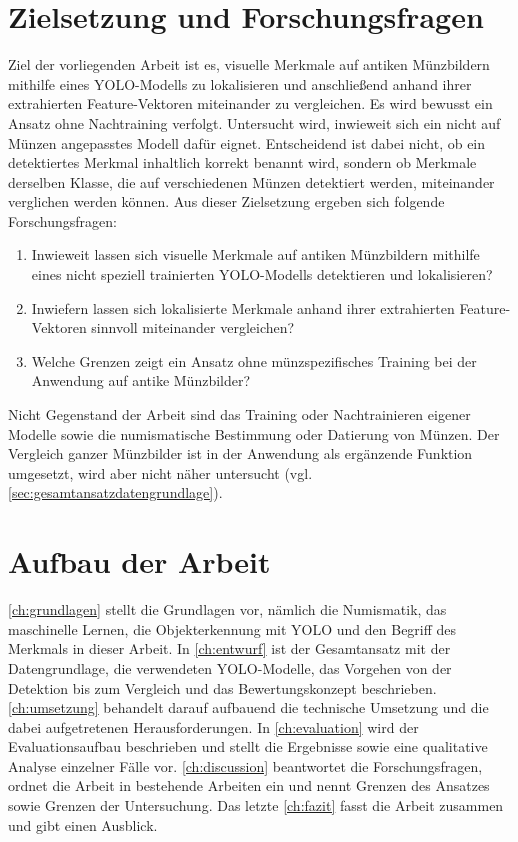 \section{Zielsetzung und Forschungsfragen}
\label{sec:zielsetzungundforschungsfragen}
Ziel der vorliegenden Arbeit ist es, visuelle Merkmale auf antiken Münzbildern mithilfe eines YOLO-Modells zu lokalisieren und anschließend anhand ihrer extrahierten Feature-Vektoren miteinander zu vergleichen. Es wird bewusst ein Ansatz ohne Nachtraining verfolgt. Untersucht wird, inwieweit sich ein nicht auf Münzen angepasstes Modell dafür eignet. Entscheidend ist dabei nicht, ob ein detektiertes Merkmal inhaltlich korrekt benannt wird, sondern ob Merkmale derselben Klasse, die auf verschiedenen Münzen detektiert werden, miteinander verglichen werden können.
Aus dieser Zielsetzung ergeben sich folgende Forschungsfragen:
\begin{enumerate}
    \item Inwieweit lassen sich visuelle Merkmale auf antiken Münzbildern mithilfe eines nicht speziell trainierten YOLO-Modells detektieren und lokalisieren?
    \item Inwiefern lassen sich lokalisierte Merkmale anhand ihrer extrahierten Feature-Vektoren sinnvoll miteinander vergleichen?
    \item Welche Grenzen zeigt ein Ansatz ohne münzspezifisches Training bei der Anwendung auf antike Münzbilder?
\end{enumerate}

\noindent Nicht Gegenstand der Arbeit sind das Training oder Nachtrainieren eigener Modelle sowie die numismatische Bestimmung oder Datierung von Münzen. Der Vergleich ganzer Münzbilder ist in der Anwendung als ergänzende Funktion umgesetzt, wird aber nicht näher untersucht (vgl. \cref{sec:gesamtansatzdatengrundlage}).

\section{Aufbau der Arbeit}
\label{sec:aufbau}
\cref{ch:grundlagen} stellt die Grundlagen vor, nämlich die Numismatik, das maschinelle Lernen, die Objekterkennung mit YOLO und den Begriff des Merkmals in dieser Arbeit. In \cref{ch:entwurf} ist der Gesamtansatz mit der Datengrundlage, die verwendeten YOLO-Modelle, das Vorgehen von der Detektion bis zum Vergleich und das Bewertungskonzept beschrieben. \cref{ch:umsetzung} behandelt darauf aufbauend die technische Umsetzung und die dabei aufgetretenen Herausforderungen. In \cref{ch:evaluation} wird der Evaluationsaufbau beschrieben und stellt die Ergebnisse sowie eine qualitative Analyse einzelner Fälle vor. \cref{ch:discussion} beantwortet die Forschungsfragen, ordnet die Arbeit in bestehende Arbeiten ein und nennt Grenzen des Ansatzes sowie Grenzen der Untersuchung. Das letzte \cref{ch:fazit} fasst die Arbeit zusammen und gibt einen Ausblick.